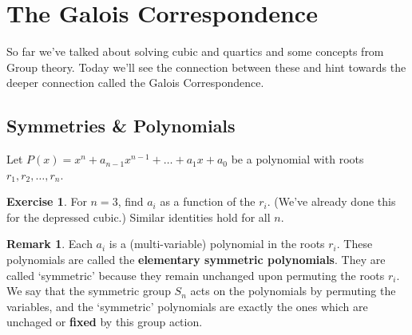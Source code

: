 \documentclass[reqno, 12pt, letter]{article}
\theoremstyle{plain}
\theoremstyle{definition}
\newtheorem{remark}[theorem]{Remark}
\newtheorem{exercise}[theorem]{Exercise}
\theoremstyle{remark}
\numberwithin{equation}{section}
\begin{document}
\newpage
\section{The Galois Correspondence}
So far we've talked about solving cubic and quartics and some concepts from Group theory. Today we'll see the connection between these and hint towards the deeper connection called the Galois Correspondence.

\subsection{Symmetries \& Polynomials}

Let $ P(x) = x^n + a_{n-1} x^{n-1} + \dots + a_1 x + a_0$ be a polynomial with roots $ r_1, r_2, \dots, r_n$.

\begin{exercise}
	\label{exercise:elementary-symmetric-functions}
	For $ n=3$, find $ a_i$ as a function of the $ r_i$. (We've already done this for the depressed cubic.) Similar identities hold for all $ n$.
\end{exercise}
\begin{remark}
	Each $ a_i$ is a (multi-variable) polynomial in the roots $ r_i$. These polynomials are called the \textbf{elementary symmetric polynomials}. They are called `symmetric' because they remain unchanged upon permuting the roots $ r_i$. We say that the symmetric group $S_n$ acts on the polynomials by permuting the variables, and the `symmetric' polynomials are exactly the ones which are unchaged or \textbf{fixed} by this group action.
\end{remark}
\end{document}
